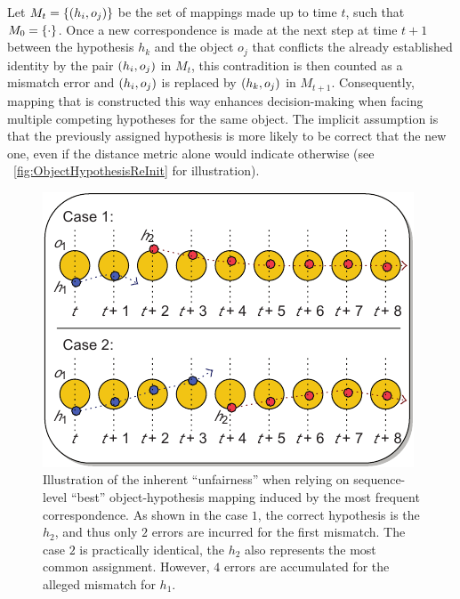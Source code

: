 Let $M_t = \left\{ {\left( {h_i, o_j} \right)} \right\}$ be the set of mappings made up to time $t$, such that $M_0 = \left\{ {\cdot} \right\}$. Once a new correspondence is made at the next step at time $t + 1$ between the hypothesis $h_k$ and the object $o_j$ that conflicts the already established identity by the pair $\left( {h_i, o_j} \right)$ in $M_t$, this contradition is then counted as a mismatch error and $\left( {h_i, o_j} \right)$ is replaced by $\left( {h_k, o_j} \right)$ in $M_{t + 1}$. Consequently, mapping that is constructed this way enhances decision-making when facing multiple competing hypotheses for the same object. The implicit assumption is that the previously assigned hypothesis is more likely to be correct that the new one, even if the distance metric alone would indicate otherwise (see \figtext{}~\ref{fig:ObjectHypothesisReInit} for illustration).

\begin{figure}[t]
    \centerline{\includegraphics[width=0.5\linewidth]{figures/theoretical_foundations/seq_based_correspondence_issues.pdf}}
    \caption[Sequence-based correspondence mismatches]{Illustration of the inherent ``unfairness'' when relying on sequence-level ``best'' object-hypothesis mapping induced by the most frequent correspondence. As shown in the case $1$, the correct hypothesis is the $h_2$, and thus only $2$ errors are incurred for the first mismatch. The case $2$ is practically identical, the $h_2$ also represents the most common assignment. However, $4$ errors are accumulated for the alleged mismatch for $h_1$. }
    \label{fig:SeqLevelMostCommonCorrespondenceProb}
\end{figure}

